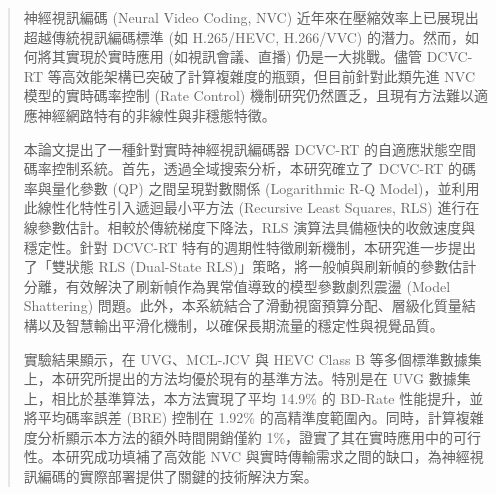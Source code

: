 
\begin{abstract}

神經視訊編碼 (Neural Video Coding, NVC) 近年來在壓縮效率上已展現出超越傳統視訊編碼標準 (如 H.265/HEVC, H.266/VVC) 的潛力。然而，如何將其實現於實時應用 (如視訊會議、直播) 仍是一大挑戰。儘管 DCVC-RT 等高效能架構已突破了計算複雜度的瓶頸，但目前針對此類先進 NVC 模型的實時碼率控制 (Rate Control) 機制研究仍然匱乏，且現有方法難以適應神經網路特有的非線性與非穩態特徵。

本論文提出了一種針對實時神經視訊編碼器 DCVC-RT 的自適應狀態空間碼率控制系統。首先，透過全域搜索分析，本研究確立了 DCVC-RT 的碼率與量化參數 (QP) 之間呈現對數關係 (Logarithmic R-Q Model)，並利用此線性化特性引入遞迴最小平方法 (Recursive Least Squares, RLS) 進行在線參數估計。相較於傳統梯度下降法，RLS 演算法具備極快的收斂速度與穩定性。針對 DCVC-RT 特有的週期性特徵刷新機制，本研究進一步提出了「雙狀態 RLS (Dual-State RLS)」策略，將一般幀與刷新幀的參數估計分離，有效解決了刷新幀作為異常值導致的模型參數劇烈震盪 (Model Shattering) 問題。此外，本系統結合了滑動視窗預算分配、層級化質量結構以及智慧輸出平滑化機制，以確保長期流量的穩定性與視覺品質。

實驗結果顯示，在 UVG、MCL-JCV 與 HEVC Class B 等多個標準數據集上，本研究所提出的方法均優於現有的基準方法。特別是在 UVG 數據集上，相比於基準算法，本方法實現了平均 14.9\% 的 BD-Rate 性能提升，並將平均碼率誤差 (BRE) 控制在 1.92\% 的高精準度範圍內。同時，計算複雜度分析顯示本方法的額外時間開銷僅約 1\%，證實了其在實時應用中的可行性。本研究成功填補了高效能 NVC 與實時傳輸需求之間的缺口，為神經視訊編碼的實際部署提供了關鍵的技術解決方案。


\end{abstract}

